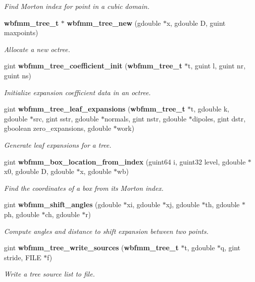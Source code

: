 \begin{DoxyCompactItemize}
\begin{DoxyCompactList}\small\item\em Find Morton index for point in a cubic domain. \end{DoxyCompactList}\item 
{\bf wbfmm\+\_\+tree\+\_\+t} $\ast$ {\bf wbfmm\+\_\+tree\+\_\+new} (gdouble $\ast$x, gdouble D, guint maxpoints)
\begin{DoxyCompactList}\small\item\em Allocate a new octree. \end{DoxyCompactList}\item 
gint {\bf wbfmm\+\_\+tree\+\_\+coefficient\+\_\+init} ({\bf wbfmm\+\_\+tree\+\_\+t} $\ast$t, guint l, guint nr, guint ns)
\begin{DoxyCompactList}\small\item\em Initialize expansion coefficient data in an octree. \end{DoxyCompactList}\item 
gint {\bf wbfmm\+\_\+tree\+\_\+leaf\+\_\+expansions} ({\bf wbfmm\+\_\+tree\+\_\+t} $\ast$t, gdouble k, gdouble $\ast$src, gint sstr, gdouble $\ast$normals, gint nstr, gdouble $\ast$dipoles, gint dstr, gboolean zero\+\_\+expansions, gdouble $\ast$work)
\begin{DoxyCompactList}\small\item\em Generate leaf expansions for a tree. \end{DoxyCompactList}\item 
gint {\bf wbfmm\+\_\+box\+\_\+location\+\_\+from\+\_\+index} (guint64 i, guint32 level, gdouble $\ast$x0, gdouble D, gdouble $\ast$x, gdouble $\ast$wb)
\begin{DoxyCompactList}\small\item\em Find the coordinates of a box from its Morton index. \end{DoxyCompactList}\item 
gint {\bf wbfmm\+\_\+shift\+\_\+angles} (gdouble $\ast$xi, gdouble $\ast$xj, gdouble $\ast$th, gdouble $\ast$ph, gdouble $\ast$ch, gdouble $\ast$r)
\begin{DoxyCompactList}\small\item\em Compute angles and distance to shift expansion between two points. \end{DoxyCompactList}\item 
gint {\bf wbfmm\+\_\+tree\+\_\+write\+\_\+sources} ({\bf wbfmm\+\_\+tree\+\_\+t} $\ast$t, gdouble $\ast$q, gint stride, F\+I\+L\+E $\ast$f)
\begin{DoxyCompactList}\small\item\em Write a tree source list to file. \end{DoxyCompactList}\item 

\end{DoxyCompactItemize}
